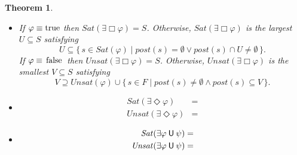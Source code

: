 \documentclass[12pt]{article}
\newcommand{\always}{\Box}
\newcommand{\eventually}{\Diamond}
\newcommand{\nxt}{\bigcirc}
\newcommand{\until}{\mathbin{\sf U}}
\newcommand{\TRUE}{\mbox{\lstinline{true}}}
\newcommand{\FALSE}{\mbox{\lstinline{false}}}
\newtheorem{theorem}{Theorem}
\theoremstyle{definition}
\begin{document}
\begin{theorem}
\begin{itemize}
\begin{align*}
\right .
\end{align*}
\item
If $\varphi \equiv \TRUE$ then $\mathit{Sat}(\exists \always \varphi) = S$.  Otherwise, $\mathit{Sat}(\exists \always \varphi)$ is the largest $U \subseteq S$ satisfying
\[
U \subseteq \{\, s \in \mathit{Sat}(\varphi) \mid \mathit{post}(s) = \emptyset \vee \mathit{post}(s) \cap U \not= \emptyset \,\}.
\]
If $\varphi \equiv \FALSE$ then $\mathit{Unsat}(\exists \always \varphi) = S$.  Otherwise, $\mathit{Unsat}(\exists \always \varphi)$ is the smallest $V \subseteq S$ satisfying
\[
V \supseteq \mathit{Unsat}(\varphi) \cup
\{\, s \in F \mid \mathit{post}(s) \not= \emptyset \wedge \mathit{post}(s) \subseteq V \,\}.
\]
\item
\begin{align*}
\mathit{Sat}(\exists \eventually \varphi) & = \\
\mathit{Unsat}(\exists \eventually \varphi) & = 
\end{align*}
\item
\begin{align*}
\mathit{Sat}(\exists \varphi \until \psi) & = \\
\mathit{Unsat}(\exists \varphi \until \psi) & = 
\end{align*}
\end{itemize}
\end{theorem}
\end{document}
